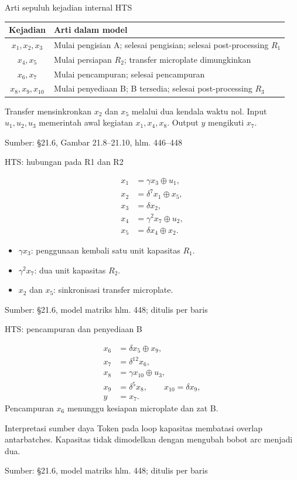 \documentclass[aspectratio=169,11pt]{beamer}
\newcommand{\source}[1]{%
    \vfill
    \hfill{\tiny\color{gray}Sumber: #1}
}
\begin{document}
\begin{frame}{Arti sepuluh kejadian internal HTS}

\small
\begin{center}\begin{tabular}{cl}\toprule
Kejadian&Arti dalam model\\\midrule
$x_1,x_2,x_3$&Mulai pengisian A; selesai pengisian; selesai post-processing $R_1$\\[2mm]
$x_4,x_5$&Mulai persiapan $R_2$; transfer microplate dimungkinkan\\[2mm]
$x_6,x_7$&Mulai pencampuran; selesai pencampuran\\[2mm]
$x_8,x_9,x_{10}$&Mulai penyediaan B; B tersedia; selesai post-processing $R_3$\\\bottomrule
\end{tabular}\end{center}
Transfer mensinkronkan $x_2$ dan $x_5$ melalui dua kendala waktu nol.
Input $u_1,u_2,u_3$ memerintah awal kegiatan $x_1,x_4,x_8$.
Output $y$ mengikuti $x_7$.

\source{\S21.6, Gambar 21.8--21.10, hlm. 446--448}
\end{frame}
\begin{frame}{HTS: hubungan pada R1 dan R2}

\begin{align*}
x_1&=\gamma x_3\oplus u_1,\\
x_2&=\delta^7x_1\oplus x_5,\\
x_3&=\delta x_2,\\
x_4&=\gamma^2x_7\oplus u_2,\\
x_5&=\delta x_4\oplus x_2.
\end{align*}
\begin{itemize}
\item $\gamma x_3$: penggunaan kembali satu unit kapasitas $R_1$.
\item $\gamma^2x_7$: dua unit kapasitas $R_2$.
\item $x_2$ dan $x_5$: sinkronisasi transfer microplate.
\end{itemize}

\source{\S21.6, model matriks hlm. 448; ditulis per baris}
\end{frame}
\begin{frame}{HTS: pencampuran dan penyediaan B}\setlength{\jot}{1pt}

\begin{align*}
x_6&=\delta x_5\oplus x_9,\\
x_7&=\delta^{12}x_6,\\
x_8&=\gamma x_{10}\oplus u_3,\\
x_9&=\delta^5x_8,\qquad x_{10}=\delta x_9,\\
y&=x_7.
\end{align*}
Pencampuran $x_6$ menunggu kesiapan microplate dan zat B.
\begin{block}{Interpretasi sumber daya}
Token pada loop kapasitas membatasi overlap antarbatches.
Kapasitas tidak dimodelkan dengan mengubah bobot arc menjadi dua.
\end{block}

\source{\S21.6, model matriks hlm. 448; ditulis per baris}
\end{frame}
\end{document}
